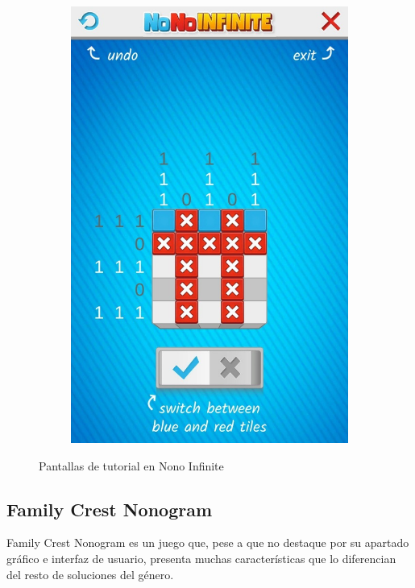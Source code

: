 \documentclass[11pt,spanish,listoffigures,listoftables]{tfgetsinf}
\begin{document}
\begin{figure}[H]
\begin{subfigure}[b]{0.4\linewidth}
     \includegraphics[width=\linewidth]{images/infinite4.jpg}
   \end{subfigure}
   \caption{Pantallas de tutorial en Nono Infinite}
   \label{fig:infinite2}
 \end{figure}

 \subsection{Family Crest Nonogram}

 Family Crest Nonogram es un juego que, pese a que no destaque por su apartado gráfico e interfaz de usuario, presenta muchas características que lo diferencian
 del resto de soluciones del género.
\end{document}
